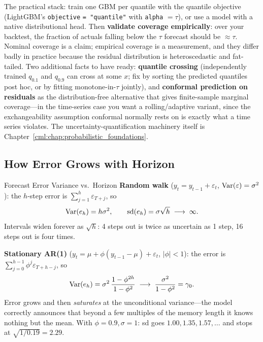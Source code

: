 The practical stack: train one GBM per quantile with the quantile objective (LightGBM's \texttt{objective} \texttt{= "quantile"} with \texttt{alpha} $= \tau$), or use a model with a native distributional head. Then \textbf{validate coverage empirically}: over your backtest, the fraction of actuals falling below the $\tau$ forecast should be $\approx \tau$. Nominal coverage is a claim; empirical coverage is a measurement, and they differ badly in practice because the residual distribution is heteroscedastic and fat-tailed. Two additional facts to have ready: \textbf{quantile crossing} (independently trained $q_{0.1}$ and $q_{0.9}$ can cross at some $x$; fix by sorting the predicted quantiles post hoc, or by fitting monotone-in-$\tau$ jointly), and \textbf{conformal prediction on residuals} as the distribution-free alternative that gives finite-sample marginal coverage---in the time-series case you want a rolling/adaptive variant, since the exchangeability assumption conformal normally rests on is exactly what a time series violates. The uncertainty-quantification machinery itself is Chapter~\ref{cml:chap:probabilistic_foundations}.

\subsection{How Error Grows with Horizon}

\begin{mathresult}{Forecast Error Variance vs.\ Horizon}
\textbf{Random walk} ($y_t = y_{t-1} + \varepsilon_t$, $\operatorname{Var}(\varepsilon) = \sigma^2$): the $h$-step error is $\sum_{j=1}^{h}\varepsilon_{T+j}$, so
\begin{equation}
\operatorname{Var}(e_h) = h\sigma^2, \qquad \text{sd}(e_h) = \sigma\sqrt{h} \;\longrightarrow\; \infty.
\end{equation}
Intervals widen forever as $\sqrt{h}$: 4 steps out is twice as uncertain as 1 step, 16 steps out is four times.

\textbf{Stationary AR(1)} ($y_t = \mu + \phi(y_{t-1}-\mu) + \varepsilon_t$, $|\phi| < 1$): the error is $\sum_{j=0}^{h-1}\phi^j \varepsilon_{T+h-j}$, so
\begin{equation}
\operatorname{Var}(e_h) = \sigma^2\,\frac{1 - \phi^{2h}}{1-\phi^2} \;\longrightarrow\; \frac{\sigma^2}{1-\phi^2} = \gamma_0 .
\end{equation}
Error grows and then \emph{saturates} at the unconditional variance---the model correctly announces that beyond a few multiples of the memory length it knows nothing but the mean. With $\phi = 0.9, \sigma = 1$: sd goes $1.00, 1.35, 1.57, \ldots$ and stops at $\sqrt{1/0.19} = 2.29$.
\end{mathresult}

